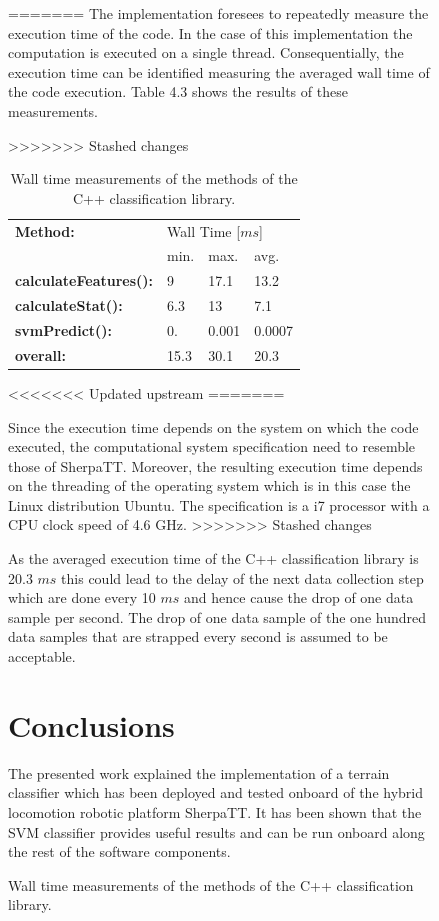 \documentclass{article}
\begin{document}
\begin{figure}[!htb]
\begin{table}[!htb]
=======
The implementation foresees to repeatedly measure the execution time of the code. In the case of this implementation the computation is executed on a single thread. Consequentially, the execution time can be identified measuring the averaged wall time of the code execution. Table 4.3 shows the results of these measurements. 

\begin{table}[htb!]
>>>>>>> Stashed changes
   \centering
    \begin{tabularx}{\columnwidth}{X|XXX}
        \textbf{Method:} & \multicolumn{3}{X}{Wall Time [$ms$]} \\
        &min.&max.&avg.\\
        \hline
        \hline
        \textbf{calculateFeatures():} & 9&  17.1& 13.2 \\
        \textbf{calculateStat():}     & 6.3 & 13 & 7.1 \\
        \textbf{svmPredict():}        &  0. &  0.001 & 0.0007  \\
        \hline
        \textbf{overall:}             & 15.3 & 30.1 &20.3  \\
    \end{tabularx}	
    \caption{Wall time measurements of the methods of the C++ classification library.}
    \label{table:compmeasurments}
\end{table}
<<<<<<< Updated upstream
=======

Since the execution time depends on the system on which the code executed, the computational system specification need to resemble those of SherpaTT. Moreover, the resulting execution time depends
on the threading of the operating system which is in this case the Linux distribution Ubuntu. The specification is a i7 processor with a CPU clock speed of 4.6 GHz. 
>>>>>>> Stashed changes

As the averaged execution time of the C++ classification library is 20.3 $ms$ this could lead to the delay of the next data collection step which are done every 10 $ms$ and hence cause the drop of one data sample per second. The drop of one data sample of the one hundred data samples that are strapped every second is assumed to be acceptable.


\section{Conclusions}

The presented work explained the implementation of a terrain classifier which has been deployed and tested onboard of the hybrid locomotion robotic platform SherpaTT.
It has been shown that the SVM classifier provides useful results and can be run onboard along the rest of the software components.


\end{table}
\end{figure}
\end{document}
